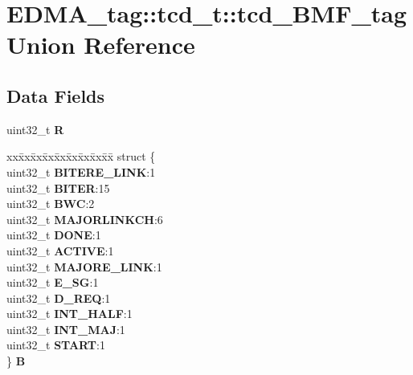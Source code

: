 \hypertarget{unionEDMA__tag_1_1tcd__t_1_1tcd__BMF__tag}{}\section{E\+D\+M\+A\+\_\+tag\+::tcd\+\_\+t\+::tcd\+\_\+\+B\+M\+F\+\_\+tag Union Reference}
\label{unionEDMA__tag_1_1tcd__t_1_1tcd__BMF__tag}
\subsection*{Data Fields}
\begin{DoxyCompactItemize}
\item 
\mbox{\label{unionEDMA__tag_1_1tcd__t_1_1tcd__BMF__tag_a5596047065642f70ae90c41e05094163}} 
uint32\+\_\+t {\bfseries R}
\item 
\mbox{\label{unionEDMA__tag_1_1tcd__t_1_1tcd__BMF__tag_a577888f88d479ed36579cc7dfe2c7898}} 
\begin{tabbing}
xx\=xx\=xx\=xx\=xx\=xx\=xx\=xx\=xx\=\kill
struct \{\\
\>uint32\_t {\bfseries BITERE\_LINK}:1\\
\>uint32\_t {\bfseries BITER}:15\\
\>uint32\_t {\bfseries BWC}:2\\
\>uint32\_t {\bfseries MAJORLINKCH}:6\\
\>uint32\_t {\bfseries DONE}:1\\
\>uint32\_t {\bfseries ACTIVE}:1\\
\>uint32\_t {\bfseries MAJORE\_LINK}:1\\
\>uint32\_t {\bfseries E\_SG}:1\\
\>uint32\_t {\bfseries D\_REQ}:1\\
\>uint32\_t {\bfseries INT\_HALF}:1\\
\>uint32\_t {\bfseries INT\_MAJ}:1\\
\>uint32\_t {\bfseries START}:1\\
\} {\bfseries B}\\


\end{tabbing}
\end{DoxyCompactItemize}
